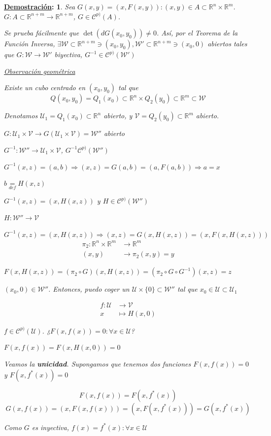 \documentclass[10pt,a4paper,openright]{book}
\theoremstyle{break}
\newtheorem*{demo}{\underline{Demostración}:}
\begin{document}
\begin{demo}
Sea $G(x,y) = (x, F(x,y)) : (x,y) \in A \subset \mathbb{R}^n \times \mathbb{R}^m$. $G : A \subset \mathbb{R}^{n+m} \to \mathbb{R}^{n+m}$, $G \in \mathcal{C}^{p)}(A)$.

Se prueba fácilmente que $\det(dG(x_0, y_0)) \neq 0$. Así, por el Teorema de la Función Inversa, $\exists \mathcal{W} \subset \mathbb{R}^{n+m} \ni (x_0, y_0), \mathcal{W}' \subset \mathbb{R}^{n+m} \ni (x_0, 0)$ abiertos tales que $G: \mathcal{W} \to \mathcal{W}'$ biyectiva, $G^{-1} \in \mathcal{C}^{p)}(\mathcal{W}')$

\underline{Observación geométrica}

Existe un cubo centrado en $(x_0, y_0)$ tal que 
$$Q(x_0, y_0) = Q_1 (x_0) \subset \mathbb{R}^n \times Q_2 (y_0) \subset \mathbb{R}^m \subset \mathcal{W} $$

Denotamos $\mathcal{U}_1 = Q_1 (x_0) \subset \mathbb{R}^n $ abierto, y $\mathcal{V} = Q_2 (y_0) \subset \mathbb{R}^m $ abierto.

$G: \mathcal{U}_1 \times \mathcal{V} \to G(\mathcal{U}_1 \times \mathcal{V}) = \mathcal{W}''$ abierto

$G^{-1}: \mathcal{W}'' \to \mathcal{U}_1 \times \mathcal{V}$, $G^{-1}\mathcal{C}^{p)}(\mathcal{W}'')$

$G^{-1}(x,z) = (a,b) \Rightarrow (x,z) = G(a,b) = (a, F(a,b)) \Rightarrow a = x$

$b \underset{def}{=} H(x,z)$

$G^{-1}(x,z) = (x, H(x,z))$ y $H \in \mathcal{C}^{p)}(\mathcal{W}'')$

$H: \mathcal{W}'' \to \mathcal{V}$

$G^{-1} (x,z) = (x, H(x,z)) \Rightarrow (x,z) = G(x, H(x,z)) = (x, F(x, H(x,z)))$
\begin{align*}
\pi_2 : \mathbb{R}^n \times \mathbb{R}^m &\to \mathbb{R}^m \\ (x,y) &\to \pi_2 (x,y) = y
\end{align*}

$F(x, H(x,z)) = (\pi_2 \circ G) (x, H(x,z)) = (\pi_2 \circ G \circ G^{-1}) (x,z) = z$

$(x_0, 0) \in \mathcal{W}''$. Entonces, puedo coger un $\mathcal{U} \times \{0\} \subset \mathcal{W}''$ tal que $x_0 \in \mathcal{U} \subset \mathcal{U}_1$

\begin{align*}
f: \mathcal{U} &\to \mathcal{V} \\ x &\mapsto H(x,0)
\end{align*} 

$f \in \mathcal{C}^{p)} (\mathcal{U})$. ¿$F(x, f(x)) = 0 : \forall x \in \mathcal{U}$?

$F(x, f(x)) = F(x, H(x,0)) = 0$

Veamos la \textbf{unicidad}. Supongamos que tenemos dos funciones $F(x, f(x)) = 0$ y $F(x, f^* (x)) = 0$

$$F(x, f(x)) = F(x, f^*(x))$$
$$G(x,f(x)) = (x, F(x,f(x))) = (x, F(x, f^* (x))) = G(x,f^* (x))$$

Como $G$ es inyectiva, $f(x) = f^* (x) : \forall x \in \mathcal{U}$
\end{demo}
\end{document}
